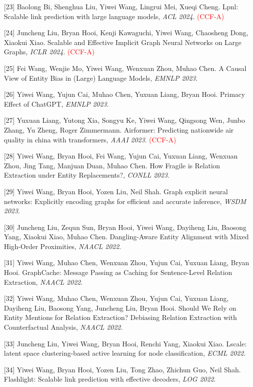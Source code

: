 [23] Baolong Bi, Shenghua Liu, Yiwei Wang, Lingrui Mei, Xueqi Cheng. Lpnl: Scalable link prediction with large language models, \textit{ACL 2024}. \textcolor{red}{(CCF-A)}

[24] Juncheng Liu, Bryan Hooi, Kenji Kawaguchi, Yiwei Wang, Chaosheng Dong, Xiaokui Xiao. Scalable and Effective Implicit Graph Neural Networks on Large Graphs, \textit{ICLR 2024}. \textcolor{red}{(CCF-A)}

[25] Fei Wang, Wenjie Mo, Yiwei Wang, Wenxuan Zhou, Muhao Chen. A Causal View of Entity Bias in (Large) Language Models, \textit{EMNLP 2023}.

[26] Yiwei Wang, Yujun Cai, Muhao Chen, Yuxuan Liang, Bryan Hooi. Primacy Effect of ChatGPT, \textit{EMNLP 2023}.

[27] Yuxuan Liang, Yutong Xia, Songyu Ke, Yiwei Wang, Qingsong Wen, Junbo Zhang, Yu Zheng, Roger Zimmermann. Airformer: Predicting nationwide air quality in china with transformers, \textit{AAAI 2023}. \textcolor{red}{(CCF-A)}

[28] Yiwei Wang, Bryan Hooi, Fei Wang, Yujun Cai, Yuxuan Liang, Wenxuan Zhou, Jing Tang, Manjuan Duan, Muhao Chen. How Fragile is Relation Extraction under Entity Replacements?, \textit{CONLL 2023}.

[29] Yiwei Wang, Bryan Hooi, Yozen Liu, Neil Shah. Graph explicit neural networks: Explicitly encoding graphs for efficient and accurate inference, \textit{WSDM 2023}.

[30] Juncheng Liu, Zequn Sun, Bryan Hooi, Yiwei Wang, Dayiheng Liu, Baosong Yang, Xiaokui Xiao, Muhao Chen. Dangling-Aware Entity Alignment with Mixed High-Order Proximities, \textit{NAACL 2022}.

[31] Yiwei Wang, Muhao Chen, Wenxuan Zhou, Yujun Cai, Yuxuan Liang, Bryan Hooi. GraphCache: Message Passing as Caching for Sentence-Level Relation Extraction, \textit{NAACL 2022}.

[32] Yiwei Wang, Muhao Chen, Wenxuan Zhou, Yujun Cai, Yuxuan Liang, Dayiheng Liu, Baosong Yang, Juncheng Liu, Bryan Hooi. Should We Rely on Entity Mentions for Relation Extraction? Debiasing Relation Extraction with Counterfactual Analysis, \textit{NAACL 2022}.

[33] Juncheng Liu, Yiwei Wang, Bryan Hooi, Renchi Yang, Xiaokui Xiao. Lscale: latent space clustering-based active learning for node classification, \textit{ECML 2022}.

[34] Yiwei Wang, Bryan Hooi, Yozen Liu, Tong Zhao, Zhichun Guo, Neil Shah. Flashlight: Scalable link prediction with effective decoders, \textit{LOG 2022}.

